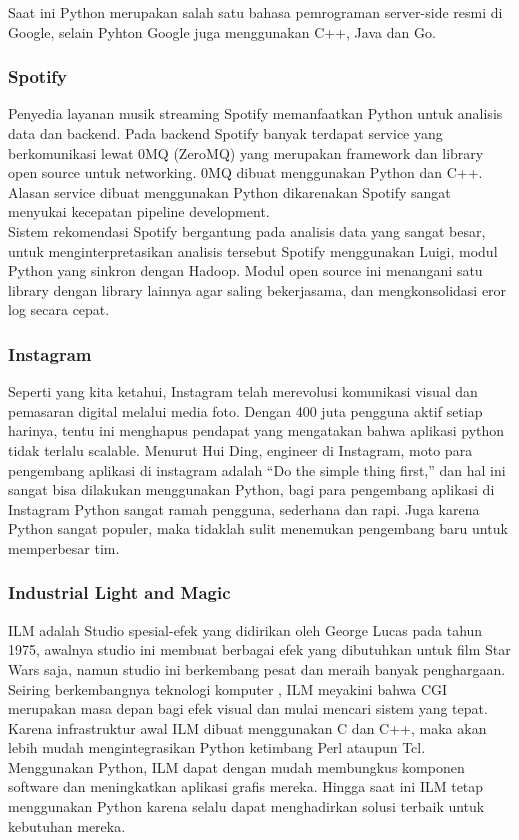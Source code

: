 \documentclass[12pt, times new roman, a4paper]{article}
\begin{document}
\noindent Saat ini Python merupakan salah satu bahasa pemrograman server-side resmi di Google, selain Pyhton Google juga menggunakan C++, Java dan Go.
\subsubsection{Spotify}
Penyedia layanan musik streaming Spotify memanfaatkan Python untuk analisis data dan backend. Pada backend Spotify banyak terdapat service yang berkomunikasi lewat 0MQ (ZeroMQ) yang merupakan framework dan library open source untuk networking. 0MQ dibuat menggunakan Python dan C++. Alasan service dibuat menggunakan Python dikarenakan Spotify sangat menyukai kecepatan pipeline development.\\

\noindent Sistem rekomendasi Spotify bergantung pada analisis data yang sangat besar, untuk menginterpretasikan analisis tersebut Spotify menggunakan Luigi, modul Python yang sinkron dengan Hadoop. Modul open source ini menangani satu library dengan library lainnya agar saling bekerjasama, dan mengkonsolidasi eror log secara cepat.
\subsubsection{Instagram}
Seperti yang kita ketahui, Instagram telah merevolusi komunikasi visual dan pemasaran digital melalui media foto. Dengan 400 juta pengguna aktif setiap harinya, tentu ini menghapus pendapat yang mengatakan bahwa aplikasi python tidak terlalu scalable. Menurut Hui Ding, engineer di Instagram, moto para pengembang aplikasi di instagram adalah “Do the simple thing first,” dan hal ini sangat bisa dilakukan menggunakan Python, bagi para pengembang aplikasi di Instagram Python sangat ramah pengguna, sederhana dan rapi. Juga karena Python sangat populer, maka tidaklah sulit menemukan pengembang baru untuk memperbesar tim.
\subsubsection{Industrial Light and Magic}
ILM adalah Studio spesial-efek yang didirikan oleh George Lucas pada tahun 1975, awalnya studio ini membuat berbagai efek yang dibutuhkan untuk film Star Wars saja, namun studio ini berkembang pesat dan meraih banyak penghargaan. Seiring berkembangnya teknologi komputer , ILM meyakini bahwa CGI merupakan masa depan bagi efek visual dan mulai mencari sistem yang tepat. Karena infrastruktur awal ILM dibuat menggunakan C dan C++, maka akan lebih mudah mengintegrasikan Python ketimbang Perl ataupun Tcl. Menggunakan Python, ILM dapat dengan mudah membungkus komponen software dan meningkatkan aplikasi grafis mereka. Hingga saat ini ILM tetap menggunakan Python karena selalu dapat menghadirkan solusi terbaik untuk kebutuhan mereka.
\end{document}
